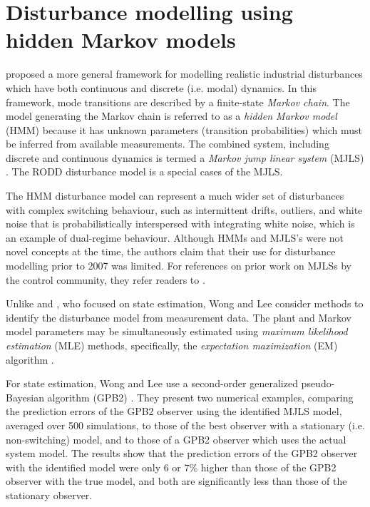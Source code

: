 \section*{Disturbance modelling using hidden Markov models}
\label{hidden_markov_models}

\cite{wong_disturbance_2007} proposed a more general framework for modelling realistic industrial disturbances which have both continuous and discrete (i.e. modal) dynamics. In this framework, mode transitions are described by a finite-state \textit{Markov chain}. The model generating the Markov chain is referred to as a \textit{hidden Markov model} (HMM) because it has unknown parameters (transition probabilities) which must be inferred from available measurements. The combined system, including discrete and continuous dynamics is termed a \textit{Markov jump linear system} (MJLS) \citep{costa_discrete-time_2005}. The RODD disturbance model is a special cases of the MJLS.


The HMM disturbance model can represent a much wider set of disturbances with complex switching behaviour, such as intermittent drifts, outliers, and white noise that is probabilistically interspersed with integrating white noise, which is an example of dual-regime behaviour. Although HMMs and MJLS's were not novel concepts at the time, the authors claim that their use for disturbance modelling prior to 2007 was limited. For references on prior work on MJLSs by the control community, they refer readers to \cite{costa_discrete-time_2005}.

Unlike \cite{robertson_detection_1995} and \cite{eriksson_classification_1996}, who focused on state estimation, Wong and Lee consider methods to identify the disturbance model from measurement data. The plant and Markov model parameters may be simultaneously estimated using \textit{maximum likelihood estimation} (MLE) methods, specifically, the \textit{expectation maximization} (EM) algorithm \citep{dempster_maximum_1977}.

For state estimation, Wong and Lee use a second-order generalized pseudo-Bayesian algorithm (GPB2)  \citep{bar-shalom_estimation_1993}. They present two numerical examples, comparing the prediction errors of the GPB2 observer using the identified MJLS model, averaged over 500 simulations, to those of the best observer with a stationary (i.e. non-switching) model, and to those of a GPB2 observer which uses the actual system model.  The results show that the prediction errors of the GPB2 observer with the identified model were only 6 or 7\% higher than those of the GPB2 observer with the true model, and both are significantly less than those of the stationary observer.

